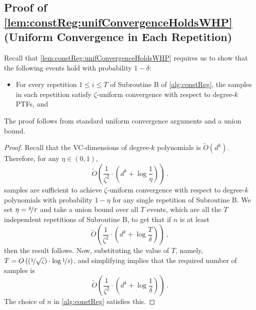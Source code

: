 \documentclass[11pt]{article}
\theoremstyle{plain}
\theoremstyle{definition}
\theoremstyle{remark}
\newcommand{\inparen}[1]{\left(#1\right)}
\newcommand{\nfrac}[2]{\nicefrac{#1}{#2}}
\newcommand{\wt}[1]{\widetilde{#1}}
\begin{document}
    \subsection{Proof of \cref{lem:constReg:unifConvergenceHoldsWHP} (Uniform Convergence in Each Repetition)}
                \label{sec:proofof:lem:constReg:unifConvergenceHoldsWHP}
                Recall that \cref{lem:constReg:unifConvergenceHoldsWHP} requires us to show that the following events hold with probability $1-\delta$:
                \begin{itemize}
                    \item For every repetition $1 \leq i \leq T$ of Subroutine B of \cref{alg:constReg}, the samples in each repetition satisfy $\zeta$-uniform convergence with respect to degree-$k$ PTFs, and
                \end{itemize}
                The proof follows from standard uniform convergence arguments and a union bound.
                \begin{proof}
                    Recall that the VC-dimensions of degree-$k$ polynomials is $\wt{O}(d^{k})$.
                    Therefore, for any $\eta\in (0,1)$, 
                    \[
                        \wt{O}\inparen{
                            \frac{1}{\zeta^2}
                            \cdot \inparen{d^k + \log{\frac{1}{\eta}}}
                        }\,.
                    \]
                    samples are sufficient to achieve $\zeta$-uniform convergence with respect to degree-$k$ polynomials with probability $1-\eta$ for any single repetition of Subroutine B.
                    We set $\eta=\nfrac{\delta}{T}$ and take a union bound over all $T$ events, which are all the $T$ independent repetitions of Subroutine B, to get that if $n$ is at least 
                    \[
                        \wt{O}\inparen{
                        \frac{1}{\zeta^2}
                        \cdot \inparen{d^k + \log{\frac{T}{\delta}}}
                        }\,,
                    \]
                    then the result follows.
                    Now, substituting the value of $T$, namely, $T=O\inparen{\inparen{\nfrac{1}{\sqrt{\zeta}}}\cdot \log{\nfrac{1}{\delta}}}$, and simplifying implies that the required number of samples is 
                    \[
                         \wt{O}\inparen{
                         \frac{1}{\zeta^2}
                            \cdot \inparen{d^k + \log{\frac{1}{\delta}}}
                        }\,.
                    \]
                    The choice of $n$ in \cref{alg:constReg} satisfies this.
                     
                \end{proof}
    
\end{document}
